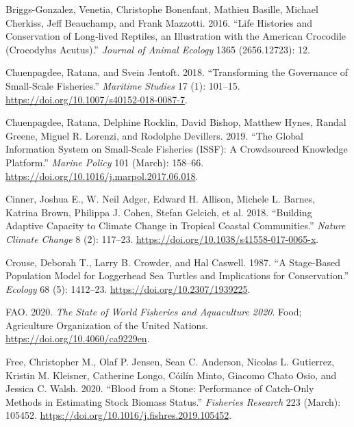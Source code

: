 \documentclass[
]{article}
\newlength{\cslhangindent}
\newlength{\cslentryspacingunit} %
\newenvironment{CSLReferences}[2] %
 {%
  \setlength{\parindent}{0pt}
  \ifodd #1
  \let\oldpar\par
  \def\par{\hangindent=\cslhangindent\oldpar}
  \fi
  \setlength{\parskip}{#2\cslentryspacingunit}
 }%
 {}
\begin{document}
\begin{CSLReferences}{1}{0}
\leavevmode{}%
Briggs-Gonzalez, Venetia, Christophe Bonenfant, Mathieu Basille, Michael Cherkiss, Jeff Beauchamp, and Frank Mazzotti. 2016. {``Life Histories and Conservation of Long‐lived Reptiles, an Illustration with the {American} Crocodile ({Crocodylus} Acutus).''} \emph{Journal of Animal Ecology} 1365 (2656.12723): 12.

\leavevmode{}%
Chuenpagdee, Ratana, and Svein Jentoft. 2018. {``Transforming the Governance of Small-Scale Fisheries.''} \emph{Maritime Studies} 17 (1): 101--15. \url{https://doi.org/10.1007/s40152-018-0087-7}.

\leavevmode{}%
Chuenpagdee, Ratana, Delphine Rocklin, David Bishop, Matthew Hynes, Randal Greene, Miguel R. Lorenzi, and Rodolphe Devillers. 2019. {``The Global Information System on Small-Scale Fisheries ({ISSF}): {A} Crowdsourced Knowledge Platform.''} \emph{Marine Policy} 101 (March): 158--66. \url{https://doi.org/10.1016/j.marpol.2017.06.018}.

\leavevmode{}%
Cinner, Joshua E., W. Neil Adger, Edward H. Allison, Michele L. Barnes, Katrina Brown, Philippa J. Cohen, Stefan Gelcich, et al. 2018. {``Building Adaptive Capacity to Climate Change in Tropical Coastal Communities.''} \emph{Nature Climate Change} 8 (2): 117--23. \url{https://doi.org/10.1038/s41558-017-0065-x}.

\leavevmode{}%
Crouse, Deborah T., Larry B. Crowder, and Hal Caswell. 1987. {``A {Stage}-{Based} {Population} {Model} for {Loggerhead} {Sea} {Turtles} and {Implications} for {Conservation}.''} \emph{Ecology} 68 (5): 1412--23. \url{https://doi.org/10.2307/1939225}.

\leavevmode{}%
FAO. 2020. \emph{The {State} of {World} {Fisheries} and {Aquaculture} 2020}. Food; Agriculture Organization of the United Nations. \url{https://doi.org/10.4060/ca9229en}.

\leavevmode{}%
Free, Christopher M., Olaf P. Jensen, Sean C. Anderson, Nicolas L. Gutierrez, Kristin M. Kleisner, Catherine Longo, Cóilín Minto, Giacomo Chato Osio, and Jessica C. Walsh. 2020. {``Blood from a Stone: {Performance} of Catch-Only Methods in Estimating Stock Biomass Status.''} \emph{Fisheries Research} 223 (March): 105452. \url{https://doi.org/10.1016/j.fishres.2019.105452}.


\end{CSLReferences}
\end{document}
